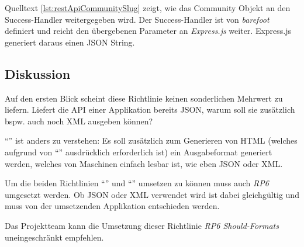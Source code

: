 Quelltext \ref{lst:restApiCommunitySlug} zeigt, wie das Community Objekt an den Success-Handler weitergegeben wird. Der Success-Handler ist von \emph{barefoot} definiert und reicht den übergebenen Parameter an \emph{Express.js} weiter. Express.js generiert daraus einen JSON String.

\subsection*{Diskussion}
Auf den ersten Blick scheint diese Richtlinie keinen sonderlichen Mehrwert zu liefern. Liefert die API einer Applikation bereits JSON, warum soll sie zusätzlich bspw. auch noch XML ausgeben können?

``'' ist anders zu verstehen: Es soll zusätzlich zum Generieren von HTML (welches aufgrund von ``'' ausdrücklich erforderlich ist) ein Ausgabeformat generiert werden, welches von Maschinen einfach lesbar ist, wie eben JSON oder XML.

Um die beiden Richtlinien ``'' und ``'' umsetzen zu können muss auch \emph{RP6} umgesetzt werden. Ob JSON oder XML verwendet wird ist dabei gleichgültig und muss von der umsetzenden Applikation entschieden werden.

Das Projektteam kann die Umsetzung dieser Richtlinie \emph{RP6 Should-Formats} uneingeschränkt empfehlen.